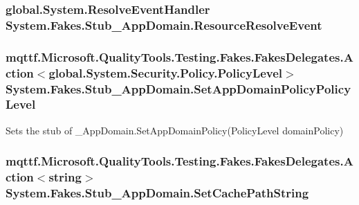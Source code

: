 \hypertarget{class_system_1_1_fakes_1_1_stub___app_domain_aff4c8c4feaaf1a5250482c2fb85c7ae4}{
\subsubsection[{Resource\-Resolve\-Event}]{\setlength{\rightskip}{0pt plus 5cm}global.\-System.\-Resolve\-Event\-Handler System.\-Fakes.\-Stub\-\_\-\-App\-Domain.\-Resource\-Resolve\-Event}}\label{class_system_1_1_fakes_1_1_stub___app_domain_aff4c8c4feaaf1a5250482c2fb85c7ae4}
\hypertarget{class_system_1_1_fakes_1_1_stub___app_domain_a68326a9988c82c276e979cc301512f94}{
\subsubsection[{Set\-App\-Domain\-Policy\-Policy\-Level}]{\setlength{\rightskip}{0pt plus 5cm}mqttf.\-Microsoft.\-Quality\-Tools.\-Testing.\-Fakes.\-Fakes\-Delegates.\-Action$<$global.\-System.\-Security.\-Policy.\-Policy\-Level$>$ System.\-Fakes.\-Stub\-\_\-\-App\-Domain.\-Set\-App\-Domain\-Policy\-Policy\-Level}}\label{class_system_1_1_fakes_1_1_stub___app_domain_a68326a9988c82c276e979cc301512f94}


Sets the stub of \-\_\-\-App\-Domain.\-Set\-App\-Domain\-Policy(\-Policy\-Level domain\-Policy)

\hypertarget{class_system_1_1_fakes_1_1_stub___app_domain_a3755f3f326a70d55d065a0d903812938}{
\subsubsection[{Set\-Cache\-Path\-String}]{\setlength{\rightskip}{0pt plus 5cm}mqttf.\-Microsoft.\-Quality\-Tools.\-Testing.\-Fakes.\-Fakes\-Delegates.\-Action$<$string$>$ System.\-Fakes.\-Stub\-\_\-\-App\-Domain.\-Set\-Cache\-Path\-String}}\label{class_system_1_1_fakes_1_1_stub___app_domain_a3755f3f326a70d55d065a0d903812938}


